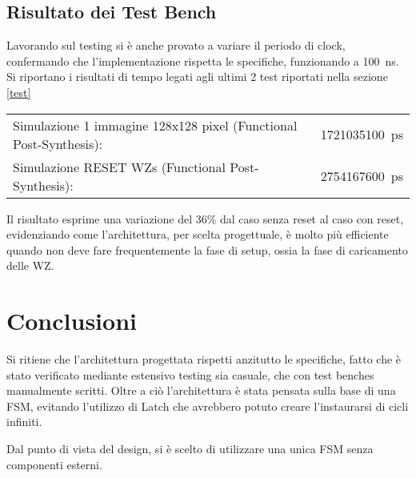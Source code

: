 \documentclass{article}
\begin{document}
\subsection{Risultato dei Test Bench}

Lavorando sul testing si è anche provato a variare il periodo di clock, confermando che l'implementazione rispetta le specifiche, funzionando a \SI{100}{\ns}.\\

Si riportano i risultati di tempo legati agli ultimi 2 test riportati nella sezione \ref{test}\\

\begin{tabular}{ll}
Simulazione 1 immagine 128x128 pixel (Functional Post-Synthesis): & \SI{1721035100}{\ps}\\
Simulazione RESET WZs (Functional Post-Synthesis): & \SI{2754167600}{\ps}\\
\end{tabular}

\bigskip
Il risultato esprime una variazione del 36\% dal caso senza reset al caso con reset, evidenziando come l'architettura, per scelta progettuale,
è molto più efficiente quando non deve fare frequentemente la fase di setup, ossia la fase di caricamento delle WZ.


\section{Conclusioni}

Si ritiene che l'architettura progettata rispetti anzitutto le specifiche, fatto che è stato verificato mediante estensivo testing sia casuale, che con test benches
manualmente scritti. Oltre a ciò l'architettura è stata pensata sulla base di una FSM, evitando l'utilizzo di Latch che avrebbero potuto creare l'instaurarsi di cicli infiniti.

Dal punto di vista del design, si è scelto di utilizzare una unica FSM senza componenti esterni.

\end{document}
